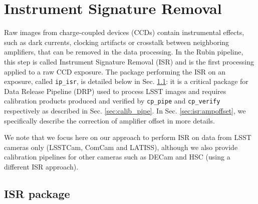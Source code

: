 \section{Instrument Signature Removal}
\label{sec:isr}

Raw images from charge-coupled devices (CCDs) contain instrumental effects, such as dark currents, clocking artifacts or crosstalk between neighboring amplifiers, that can be removed in the data processing.
In the Rubin pipeline, this step is called Instrument Signature Removal (ISR) and is the first processing applied to a raw CCD exposure.
The package performing the ISR on an exposure, called \texttt{ip\_isr}, is detailed below in Sec. \ref{sec:ip_isr}: it is a critical package for Data Release Pipeline (DRP) used to process LSST images and requires calibration products produced and verified by \texttt{cp\_pipe} and \texttt{cp\_verify} respectively as described in Sec. \ref{sec:calib_pipe}.
In Sec. \ref{sec:isr:ampoffset}, we specifically describe the correction of amplifier offset in more details.

We note that we focus here on our approach to perform ISR on data from LSST cameras only (LSSTCam, ComCam and LATISS), although we also provide calibration pipelines for other cameras such as DECam and HSC (using a different ISR approach).

\subsection{ISR package}
\label{sec:ip_isr}

